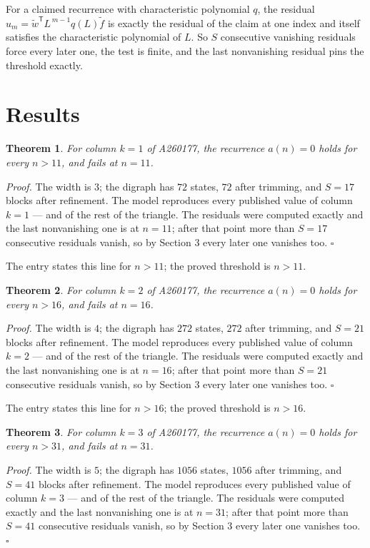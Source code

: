 \documentclass[11pt]{article}
\newtheorem{theorem}{Theorem}
\theoremstyle{definition}
\begin{document}
For a claimed recurrence with characteristic polynomial $q$, the residual $u_m = \tilde w^{\mathsf T}L^{\,m-1}q(L)\tilde f$ is exactly the residual of the claim at one index and itself satisfies the characteristic polynomial of $L$. So $S$ consecutive vanishing residuals force every later one, the test is finite, and the last nonvanishing residual pins the threshold exactly.

\section{Results}

\begin{theorem} For column $k = 1$ of A260177, the recurrence $a(n) = 0$ holds for every $n > 11$, and fails at $n = 11$.\end{theorem}

{\itshape Proof.} The width is $3$; the digraph has $72$ states, $72$ after trimming, and $S = 17$ blocks after refinement. The model reproduces every published value of column $k = 1$ --- and of the rest of the triangle. The residuals were computed exactly and the last nonvanishing one is at $n = 11$; after that point more than $S = 17$ consecutive residuals vanish, so by Section 3 every later one vanishes too. $\square$

The entry states this line for $n > 11$; the proved threshold is $n > 11$.

\begin{theorem} For column $k = 2$ of A260177, the recurrence $a(n) = 0$ holds for every $n > 16$, and fails at $n = 16$.\end{theorem}

{\itshape Proof.} The width is $4$; the digraph has $272$ states, $272$ after trimming, and $S = 21$ blocks after refinement. The model reproduces every published value of column $k = 2$ --- and of the rest of the triangle. The residuals were computed exactly and the last nonvanishing one is at $n = 16$; after that point more than $S = 21$ consecutive residuals vanish, so by Section 3 every later one vanishes too. $\square$

The entry states this line for $n > 16$; the proved threshold is $n > 16$.

\begin{theorem} For column $k = 3$ of A260177, the recurrence $a(n) = 0$ holds for every $n > 31$, and fails at $n = 31$.\end{theorem}

{\itshape Proof.} The width is $5$; the digraph has $1056$ states, $1056$ after trimming, and $S = 41$ blocks after refinement. The model reproduces every published value of column $k = 3$ --- and of the rest of the triangle. The residuals were computed exactly and the last nonvanishing one is at $n = 31$; after that point more than $S = 41$ consecutive residuals vanish, so by Section 3 every later one vanishes too. $\square$
\end{document}
